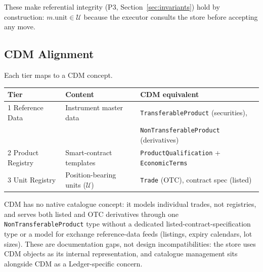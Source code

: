 These make referential integrity (P3, Section~\ref{sec:invariants}) hold by construction: $m.\text{unit} \in \mathcal{U}$ because the executor consults the store before accepting any move.

\subsection{CDM Alignment}

Each tier maps to a CDM concept.

\begin{center}
\small
\begin{tabular}{lll}
\toprule
\textbf{Tier} & \textbf{Content} & \textbf{CDM equivalent} \\
\midrule
1 Reference Data & Instrument master data & \texttt{TransferableProduct} (securities), \\
 & & \texttt{NonTransferableProduct} (derivatives) \\
2 Product Registry & Smart-contract templates & \texttt{ProductQualification} + \texttt{EconomicTerms} \\
3 Unit Registry & Position-bearing units ($\mathcal{U}$) & \texttt{Trade} (OTC), contract spec (listed) \\
\bottomrule
\end{tabular}
\end{center}

CDM has no native catalogue concept: it models individual trades, not registries, and serves both listed and OTC derivatives through one \texttt{NonTransferableProduct} type without a dedicated listed-contract-specification type or a model for exchange reference-data feeds (listings, expiry calendars, lot sizes). These are documentation gaps, not design incompatibilities: the store uses CDM objects as its internal representation, and catalogue management sits alongside CDM as a Ledger-specific concern.
